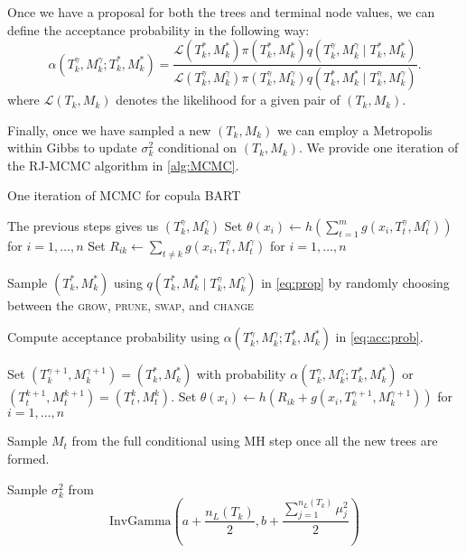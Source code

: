 \documentclass{amsart}
\begin{document}
Once we have a proposal for both the trees and terminal node values, we can define the acceptance probability in the following way:
\begin{equation}\label{eq:acc:prob}
	\alpha\left(T_k^{\gamma},M_k^{\gamma};T_k^\ast, M_k^\ast\right)
	= \frac{\mathcal{L}(T_k^\ast,M_k^\ast)\pi(T_k^\ast,M_k^\ast)q\left(T_k^{\gamma},M_k^{\gamma}\mid T_k^\ast, M_k^\ast\right)}
	{\mathcal{L}(T_k^{\gamma},M_k^{\gamma})\pi(T_k^{\gamma},M_k^{\gamma}) q\left(T_k^\ast, M_k^\ast \mid T_k^{\gamma},M_k^{\gamma}\right)}.
\end{equation}
where $\mathcal{L}(T_k,M_k)$ denotes the likelihood for a given pair of $(T_k,M_k)$.

Finally, once we have sampled a new $(T_k,M_k)$ we can employ a Metropolis within Gibbs to update $\sigma_{k}^2$ conditional on $(T_k,M_k)$. We provide one iteration of the RJ-MCMC algorithm in \cref{alg:MCMC}.
 
\begin{algorithm}
	\caption{One iteration of MCMC for copula BART}\label{alg:MCMC}
	\begin{algorithmic}[1]
		\State The previous steps gives us $(T_k^{\gamma},M_k^{\gamma})$
		\State Set $\theta(x_i) \leftarrow h\left(\sum_{t=1}^{m} g(x_i, T_t^{\gamma},M_t^{\gamma})\right)$ for $i = 1, \ldots, n$
		\State Set $R_{ik} \leftarrow \sum_{t\not=k}g(x_i, T_t^{\gamma},M_t^{\gamma})$ for $i = 1, \ldots, n$
		
		\State Sample $(T_k^\ast, M_k^\ast)$ using $q\left(T_k^\ast, M_k^\ast \mid T_k^{\gamma},M_k^{\gamma}\right)$ in \cref{eq:prop} by randomly choosing between the \textsc{grow}, \textsc{prune}, \textsc{swap}, and \textsc{change} 
		
		\State Compute acceptance probability using $\alpha\left(T_k^{\gamma},M_k^{\gamma};T_k^\ast, M_k^\ast\right)$ in \cref{eq:acc:prob}.
		
		\State Set $(T_k^{\gamma+1}, M_k^{\gamma+1})=(T_k^\ast, M_k^\ast)$ with probability $\alpha\left(T_k^{\gamma},M_k^{\gamma};T_k^\ast, M_k^\ast\right)$ or $(T_t^{k+1}, M_t^{k+1})=(T_t^k,M_t^k)$.
		\State Set $\theta(x_i) \leftarrow h(R_{ik} + g(x_i, T_k^{\gamma+1}, M_k^{\gamma+1}))$ for $i = 1, \ldots, n$
		
		\State Sample $M_t$ from the full conditional using MH step once all the new trees are formed.
		
		\State Sample $\sigma_{k}^2$ from 
		\begin{equation*}
			\text{InvGamma}\left(a+\frac{n_L(T_k)}{2} , b + \frac{\sum_{j=1}^{n_L(T_k)}\mu_j^2}{2}\right)
		\end{equation*}
		\EndFor
	\end{algorithmic}
\end{algorithm}
\end{document}
